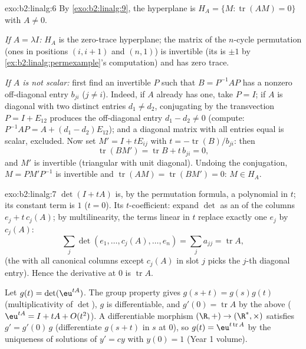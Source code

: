 \begin{solution}{exo:b2:linalg:6}
By \cref{exo:b2:linalg:9}, the hyperplane is $H_A = \{M :
\operatorname{tr}(AM) = 0\}$ with $A \neq 0$.

\emph{If $A = \lambda I$:} $H_A$ is the zero-trace hyperplane; the
matrix of the $n$-cycle permutation (ones in positions $(i, i+1)$
and $(n, 1)$) is invertible (its  is $\pm 1$ by
\cref{ex:b2:linalg:permexample}'s computation) and has zero trace.

\emph{If $A$ is not scalar:} first find an invertible $P$ such that
$B = P^{-1}AP$ has a nonzero off-diagonal entry $b_{ji}$ ($j \neq
i$). Indeed, if $A$ already has one, take $P = I$; if $A$ is
diagonal with two distinct entries $d_1 \neq d_2$, conjugating by
the transvection $P = I + E_{12}$ produces the off-diagonal entry
$d_1 - d_2 \neq 0$ (compute: $P^{-1}AP = A + (d_1 - d_2)E_{12}$);
and a diagonal matrix with all entries equal is
scalar, excluded. Now set $M' = I + tE_{ij}$ with $t =
-\operatorname{tr}(B)/b_{ji}$: then
\[
\operatorname{tr}(BM') = \operatorname{tr} B + t\,b_{ji} = 0,
\]
and $M'$ is invertible (triangular with unit diagonal). Undoing the
conjugation, $M = PM'P^{-1}$ is invertible and
$\operatorname{tr}(AM) = \operatorname{tr}(BM') = 0$: $M \in H_A$.
\end{solution}

\begin{solution}{exo:b2:linalg:7}
$\det(I + tA)$ is, by the permutation formula, a polynomial in $t$;
its constant term is $1$ ($t = 0$). Its $t$-coefficient: expand
$\det$ as an  of the columns $e_j + t\,c_j(A)$; by
multilinearity, the terms linear in $t$ replace exactly one $e_j$ by
$c_j(A)$:
\[
\sum_{j} \det(e_1, \dots, c_j(A), \dots, e_n)
= \sum_j a_{jj} = \operatorname{tr} A ,
\]
(the  with all canonical columns except $c_j(A)$ in slot
$j$ picks the $j$-th diagonal entry). Hence the derivative at $0$ is
$\operatorname{tr} A$.

Let $g(t) = \det(\eu^{tA})$. The group property gives $g(s + t) =
g(s)g(t)$ (multiplicativity of $\det$), $g$ is differentiable, and
$g'(0) = \operatorname{tr} A$ by the above ($\eu^{tA} = I + tA +
O(t^2)$). A differentiable morphism $(\R, +) \to (\R^*, \times)$
satisfies $g' = g'(0)\,g$ (differentiate $g(s+t)$ in $s$ at $0$), so
$g(t) = \eu^{t\operatorname{tr} A}$ by the uniqueness of solutions
of $y' = cy$ with $y(0) = 1$ (Year 1 volume).
\end{solution}


